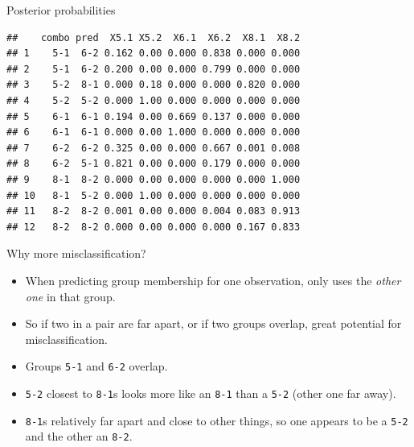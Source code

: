 \begin{frame}[fragile]{Posterior probabilities}
  
\begin{knitrout}
\color{fgcolor}\begin{kframe}
\begin{alltt}
\hlkwb{=}\hlopt{$}\hlstd{)}
\hlopt{$}
\end{alltt}
\begin{verbatim}
##    combo pred  X5.1 X5.2  X6.1  X6.2  X8.1  X8.2
## 1    5-1  6-2 0.162 0.00 0.000 0.838 0.000 0.000
## 2    5-1  6-2 0.200 0.00 0.000 0.799 0.000 0.000
## 3    5-2  8-1 0.000 0.18 0.000 0.000 0.820 0.000
## 4    5-2  5-2 0.000 1.00 0.000 0.000 0.000 0.000
## 5    6-1  6-1 0.194 0.00 0.669 0.137 0.000 0.000
## 6    6-1  6-1 0.000 0.00 1.000 0.000 0.000 0.000
## 7    6-2  6-2 0.325 0.00 0.000 0.667 0.001 0.008
## 8    6-2  5-1 0.821 0.00 0.000 0.179 0.000 0.000
## 9    8-1  8-2 0.000 0.00 0.000 0.000 0.000 1.000
## 10   8-1  5-2 0.000 1.00 0.000 0.000 0.000 0.000
## 11   8-2  8-2 0.001 0.00 0.000 0.004 0.083 0.913
## 12   8-2  8-2 0.000 0.00 0.000 0.000 0.167 0.833
\end{verbatim}
\end{kframe}
\end{knitrout}
  
\end{frame}

\begin{frame}[fragile]{Why more misclassification?}
  
  \begin{itemize}
  \item When predicting group membership for one observation, only
    uses the \emph{other one} in that group.
  \item So if two in a pair are far apart, or if two groups overlap,
    great potential for misclassification.
  \item Groups \texttt{5-1} and \texttt{6-2} overlap.
  \item \texttt{5-2} closest to \texttt{8-1}s looks more like an
    \texttt{8-1} than a \texttt{5-2} (other one far away).
  \item \texttt{8-1}s relatively far apart and close to other things,
    so one appears to be a \texttt{5-2} and the other an \texttt{8-2}.
  \end{itemize}
  
\end{frame}


